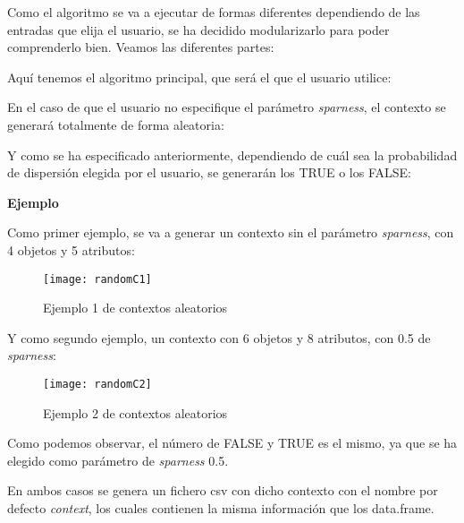     Como el algoritmo se va a ejecutar de formas diferentes dependiendo de las entradas que elija el usuario, se ha decidido modularizarlo 
    para poder comprenderlo bien. Veamos las diferentes partes:


    Aqu\'i tenemos el algoritmo principal, que ser\'a el que el usuario utilice:

    
    \bigskip

    En el caso de que el usuario no especifique el par\'ametro \textit{sparness}, el contexto se generar\'a totalmente de forma aleatoria:

    
    \bigskip

    Y como se ha especificado anteriormente, dependiendo de cu\'al sea la probabilidad de dispersi\'on elegida por el usuario, se generar\'an 
    los TRUE o los FALSE:

    
    \clearpage
    
    \bigskip

    \textbf{Ejemplo}

    Como primer ejemplo, se va a generar un contexto sin el par\'ametro \textit{sparness}, con 4 objetos y 5 atributos:

    \begin{figure}[H]
        \centering
        \texttt{[image: randomC1]}
        \caption{Ejemplo 1 de contextos aleatorios}
        \label{fig:randomC1}
    \end{figure}

    \bigskip
    Y como segundo ejemplo, un contexto con 6 objetos y 8 atributos, con 0.5 de \textit{sparness}:

    \begin{figure}[H]
        \centering
        \texttt{[image: randomC2]}
        \caption{Ejemplo 2 de contextos aleatorios}
        \label{fig:randomC2}
    \end{figure}

    Como podemos observar, el n\'umero de FALSE y TRUE es el mismo, ya que se ha elegido como par\'ametro de \textit{sparness} 0.5.
    

    En ambos casos se genera un fichero csv con dicho contexto con el nombre por defecto \textit{context}, los cuales contienen la misma 
    información que los data.frame.

    \newpage
    \thispagestyle{empty}
    \mbox{}
    \newpage